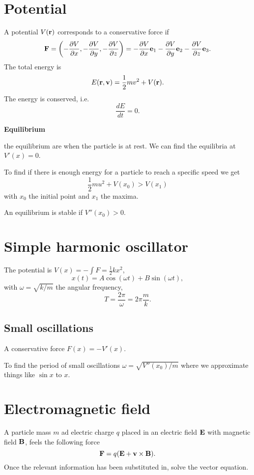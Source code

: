 \documentclass[10pt, a4paper]{article}
\begin{document}
\section{Potential}

A potential $V(\mbf{r})$ corresponds to a conservative force if
\[
\mbf{F} = \left(-\pd[V]{x}, -\pd[V]{y}, -\pd[V]{z}\right) = -\pd[V]{x}\mbf{e}_1 - \pd[V]{y}\mbf{e}_2 - \pd[V]{z}\mbf{e}_3.
\]
The total energy is
\[
E(\mbf{r}, \mbf{v}) = \frac{1}{2}mv ^ 2 + V(\mbf{r}).
\]
The energy is conserved,
i.e.
\[
\frac{dE}{dt} = 0.
\]

\textbf{Equilibrium}

the equilibrium are when the particle is at rest.
We can find the equilibria at $V'(x) = 0$.

To find if there is enough energy for a particle to reach a specific speed we get
\[
\frac{1}{2}mu ^ 2 + V(x_0) > V(x_1)
\]
with $x_0$ the initial point and $x_1$ the maxima.

An equilibrium is stable if $V''(x_0) > 0$.

\newpage

\section{Simple harmonic oscillator}
The potential is $V(x) = -\int F = \frac{1}{2}kx ^ 2$,
\[
x(t) = A\cos(\omega t) + B\sin(\omega t),
\]
with $\omega = \sqrt{k / m}$ the angular frequency,
\[
T = \frac{2\pi}{\omega} = 2\pi\frac{m}{k}.
\]

\subsection{Small oscillations}
A conservative force $F(x) = -V'(x)$.

To find the period of small oscillations $\omega = \sqrt{V''(x_0) / m}$ where we approximate things like $\sin{x}$ to $x$.

\newpage

\section{Electromagnetic field}
A particle mass $m$ ad electric charge $q$ placed in an electric field $\mbf{E}$ with magnetic field $\mbf{B}$,
feels the following force
\[
\mbf{F} = q(\mbf{E} + \mbf{v} \times \mbf{B}).
\]
Once the relevant information has been substituted in,
solve the vector equation. 

\newpage
\end{document}
